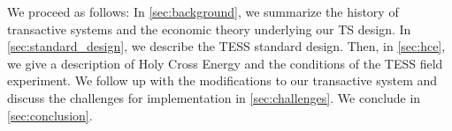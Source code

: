 We proceed as follows: In \cref{sec:background}, we summarize the history of transactive systems and the economic theory underlying our TS design. In \cref{sec:standard_design}, we describe the TESS standard design. Then, in \cref{sec:hce}, we give a description of Holy Cross Energy and the conditions of the TESS field experiment. We follow up with the modifications to our transactive system and discuss the challenges for implementation in \cref{sec:challenges}. We conclude in \cref{sec:conclusion}.

